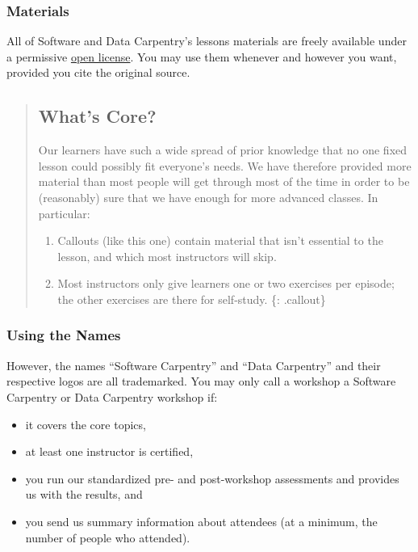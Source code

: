 \subsubsection{Materials}\label{materials}

All of Software and Data Carpentry's lessons materials are freely
available under a permissive
\href{\{\{\%20page.root\%20\}\}/license/}{open license}. You may use
them whenever and however you want, provided you cite the original
source.

\begin{quote}
\subsection{What's Core?}\label{whats-core}

Our learners have such a wide spread of prior knowledge that no one
fixed lesson could possibly fit everyone's needs. We have therefore
provided more material than most people will get through most of the
time in order to be (reasonably) sure that we have enough for more
advanced classes. In particular:

\begin{enumerate}
\def\labelenumi{\arabic{enumi}.}
\itemsep1pt\parskip0pt
\item
  Callouts (like this one) contain material that isn't essential to the
  lesson, and which most instructors will skip.
\item
  Most instructors only give learners one or two exercises per episode;
  the other exercises are there for self-study. \{: .callout\}
\end{enumerate}
\end{quote}

\subsubsection{Using the Names}\label{using-the-names}

However, the names ``Software Carpentry'' and ``Data Carpentry'' and
their respective logos are all trademarked. You may only call a workshop
a Software Carpentry or Data Carpentry workshop if:

\begin{itemize}
\itemsep1pt\parskip0pt
\item
  it covers the core topics,
\item
  at least one instructor is certified,
\item
  you run our standardized pre- and post-workshop assessments and
  provides us with the results, and
\item
  you send us summary information about attendees (at a minimum, the
  number of people who attended).
\end{itemize}


